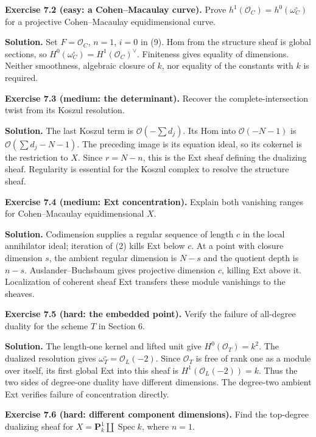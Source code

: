 \documentclass[11pt]{article}
\begin{document}
\textbf{Exercise 7.2 (easy: a Cohen--Macaulay curve).} Prove
\(h^1(\mathcal O_C)=h^0(\omega_C^\circ)\) for a projective
Cohen--Macaulay equidimensional curve.

\textbf{Solution.} Set \(F=\mathcal O_C\), \(n=1\), \(i=0\) in (9). Hom
from the structure sheaf is global sections, so
\(H^0(\omega_C^\circ)=H^1(\mathcal O_C)^\vee\). Finiteness gives
equality of dimensions. Neither smoothness, algebraic closure of \(k\),
nor equality of the constants with \(k\) is required.

\textbf{Exercise 7.3 (medium: the determinant).} Recover the
complete-intersection twist from its Koszul resolution.

\textbf{Solution.} The last Koszul term is \(\mathcal O(-\sum d_j)\).
Its Hom into \(\mathcal O(-N-1)\) is \(\mathcal O(\sum d_j-N-1)\). The
preceding image is its equation ideal, so its cokernel is the
restriction to \(X\). Since \(r=N-n\), this is the Ext sheaf defining
the dualizing sheaf. Regularity is essential for the Koszul complex to
resolve the structure sheaf.

\textbf{Exercise 7.4 (medium: Ext concentration).} Explain both
vanishing ranges for Cohen--Macaulay equidimensional \(X\).

\textbf{Solution.} Codimension supplies a regular sequence of length
\(c\) in the local annihilator ideal; iteration of (2) kills Ext below
\(c\). At a point with closure dimension \(s\), the ambient regular
dimension is \(N-s\) and the quotient depth is \(n-s\).
Auslander--Buchsbaum gives projective dimension \(c\), killing Ext above
it. Localization of coherent sheaf Ext transfers these module vanishings
to the sheaves.

\textbf{Exercise 7.5 (hard: the embedded point).} Verify the failure of
all-degree duality for the scheme \(T\) in Section 6.

\textbf{Solution.} The length-one kernel and lifted unit give
\(H^0(\mathcal O_T)=k^2\). The dualized resolution gives
\(\omega_T^\circ=\mathcal O_L(-2)\). Since \(\mathcal O_T\) is free of
rank one as a module over itself, its first global Ext into this sheaf
is \(H^1(\mathcal O_L(-2))=k\). Thus the two sides of degree-one duality
have different dimensions. The degree-two ambient Ext verifies failure
of concentration directly.

\textbf{Exercise 7.6 (hard: different component dimensions).} Find the
top-degree dualizing sheaf for
\(X=\mathbf P^1_k\amalg\operatorname{Spec}k\), where \(n=1\).
\end{document}
